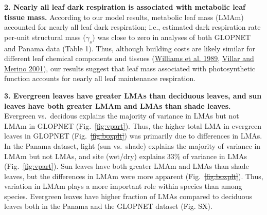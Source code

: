 \documentclass[
  12pt,
  a4paper,
,tablecaptionabove
]{scrartcl}
\providecommand{\DIFaddtex}[1]{{\protect\color{blue}\uwave{#1}}} %
\providecommand{\DIFdeltex}[1]{{\protect\color{red}\sout{#1}}}                      %
\providecommand{\DIFaddbegin}{} %
\providecommand{\DIFaddend}{} %
\providecommand{\DIFdelbegin}{} %
\providecommand{\DIFdelend}{} %
\providecommand{\DIFadd}[1]{\texorpdfstring{\DIFaddtex{#1}}{#1}} %
\providecommand{\DIFdel}[1]{\texorpdfstring{\DIFdeltex{#1}}{}} %
\newcommand{\DIFscaledelfig}{0.5}
\newlength{\DIFdelgraphicswidth} %
\newlength{\DIFdelgraphicsheight} %
\newcommand{\DIFaddincludegraphics}[2][]{{\color{blue}\fbox{\DIFOincludegraphics[#1]{#2}}}} %
\newcommand{\DIFdelincludegraphics}[2][]{%
\sbox{\DIFdelgraphicsbox}{\DIFOincludegraphics[#1]{#2}}%
\settoboxwidth{\DIFdelgraphicswidth}{\DIFdelgraphicsbox} %
\settoboxtotalheight{\DIFdelgraphicsheight}{\DIFdelgraphicsbox} %
\scalebox{\DIFscaledelfig}{%
\parbox[b]{\DIFdelgraphicswidth}{\usebox{\DIFdelgraphicsbox}\\[-\baselineskip] \rule{\DIFdelgraphicswidth}{0em}}\llap{\resizebox{\DIFdelgraphicswidth}{\DIFdelgraphicsheight}{%
\setlength{\unitlength}{\DIFdelgraphicswidth}%
\begin{picture}(1,1)%
\thicklines\linethickness{2pt} %
{\color[rgb]{1,0,0}\put(0,0){\framebox(1,1){}}}%
{\color[rgb]{1,0,0}\put(0,0){\line( 1,1){1}}}%
{\color[rgb]{1,0,0}\put(0,1){\line(1,-1){1}}}%
\end{picture}%
}\hspace*{3pt}}} %
} %
\DeclareRobustCommand{\DIFaddbegin}{\DIFOaddbegin \let\includegraphics\DIFaddincludegraphics} %
\DeclareRobustCommand{\DIFaddend}{\DIFOaddend \let\includegraphics\DIFOincludegraphics} %
\DeclareRobustCommand{\DIFdelbegin}{\DIFOdelbegin \let\includegraphics\DIFdelincludegraphics} %
\DeclareRobustCommand{\DIFdelend}{\DIFOaddend \let\includegraphics\DIFOincludegraphics} %
\begin{document}
\textbf{2. Nearly all leaf dark respiration is associated with metabolic
leaf tissue mass.} According to our model results, metabolic leaf mass
(LMAm) accounted for nearly all leaf dark respiration; i.e., estimated
dark respiration rate per-unit structural mass (\(\gamma_s\)) was close
to zero in analyses of both GLOPNET and Panama data (Table 1). Thus,
although building costs are likely similar for different leaf chemical
components and tissues (\protect\hyperlink{ref-Williams1989}{Williams et
al. 1989}, \protect\hyperlink{ref-Villar2001}{Villar and Merino 2001}),
our results suggest that leaf mass associated with photosynthetic
function accounts for nearly all leaf maintenance respiration.

\textbf{3. Evergreen leaves have greater LMAs than deciduous leaves, and
sun leaves have both greater LMAm and LMAs than shade leaves.} Evergreen
vs.~decidous explains the majority of variance in LMAs but not LMAm in
GLOPNET (Fig.~\DIFdelbegin \DIFdel{\ref{fig:vpart}}\DIFdelend \DIFaddbegin \DIFadd{\ref{fig-vpart}}\DIFaddend ). Thus, the higher total LMA in evergreen
leaves in GLOPNET (Fig.~\DIFdelbegin \DIFdel{\ref{fig:boxplt}}\DIFdelend \DIFaddbegin \DIFadd{\ref{fig-boxplt}}\DIFaddend ) was primarily due to
differences in LMAs. In the Panama dataset, light (sun vs.~shade)
explains the majority of variance in LMAm but not LMAs, and site
(wet/dry) explains 33\% of variance in LMAs (Fig.~\DIFdelbegin \DIFdel{\ref{fig:vpart}}\DIFdelend \DIFaddbegin \DIFadd{\ref{fig-vpart}}\DIFaddend ). Sun
leaves have both greater LMAm and LMAs than shade leaves, but the
differences in LMAm were more apparent (Fig.~\DIFdelbegin \DIFdel{\ref{fig:boxplt}}\DIFdelend \DIFaddbegin \DIFadd{\ref{fig-boxplt}}\DIFaddend ). Thus,
variation in LMAm plays a more important role within species than among
species. Evergreen leaves have higher fraction of LMAs compared to
deciduous leaves both in the Panama and the GLOPNET dataset (Fig.
\DIFdelbegin \DIFdel{SX}\DIFdelend \DIFaddbegin \DIFadd{S\ref{fig-box_frac}}\DIFaddend ).
\end{document}
